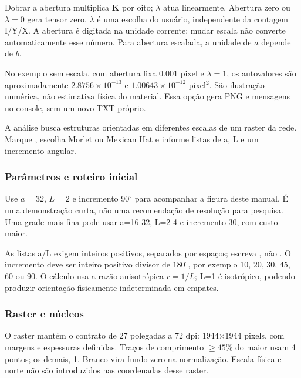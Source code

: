 Dobrar a abertura multiplica \(\mathbf K\) por oito; \(\lambda\) atua linearmente. Abertura zero ou \(\lambda=0\) gera tensor zero. \(\lambda\) é uma escolha do usuário, independente da contagem I/Y/X. A abertura é digitada na unidade corrente; mudar escala não converte automaticamente esse número. Para abertura escalada, a unidade de \(a\) depende de \(b\).

No exemplo sem escala, com abertura fixa 0.001 pixel e \(\lambda=1\), os autovalores são aproximadamente \(2.8756\times10^{-13}\) e \(1.00643\times10^{-12}\) pixel\(^{2}\). São ilustração numérica, não estimativa física do material. Essa opção gera PNG e mensagens no console, sem um novo TXT próprio.

\label{sec:wavelets}
A análise busca estruturas orientadas em diferentes escalas de um raster da rede. Marque , escolha Morlet ou Mexican Hat e informe listas de a, L e um incremento angular.

\subsubsection{Parâmetros e roteiro inicial}
Use \(a=32\), \(L=2\) e incremento \(90^\circ\) para acompanhar a figura deste manual. É uma demonstração curta, não uma recomendação de resolução para pesquisa. Uma grade mais fina pode usar a=16 32, L=2 4 e incremento 30, com custo maior.

As listas a/L exigem inteiros positivos, separados por espaços; escreva , não . O incremento deve ser inteiro positivo divisor de \(180^\circ\), por exemplo 10, 20, 30, 45, 60 ou 90. O cálculo usa a razão anisotrópica \(r=1/L\); L=1 é isotrópico, podendo produzir orientação fisicamente indeterminada em empates.

\subsubsection{Raster e núcleos}
O raster mantém o contrato de 27 polegadas a 72 dpi: 1944\(\times\)1944 pixels, com margens e espessuras definidas. Traços de comprimento \(\geq45\%\) do maior usam 4 pontos; os demais, 1. Branco vira fundo zero na normalização. Escala física e norte não são introduzidos nas coordenadas desse raster.


